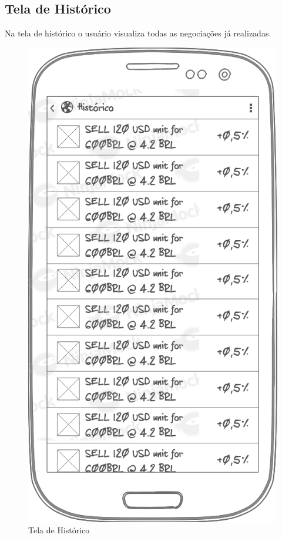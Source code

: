 \subsection{Tela de Histórico}
Na tela de histórico o usuário visualiza todas as negociações já realizadas.

\begin{figure}[H]
  \caption{\label{fig:mock_login}Tela de Histórico}
  \centering
  \includegraphics[scale=0.4]{imagens/mocks/history.png}
\end{figure}

